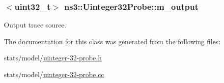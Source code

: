 \subsubsection[{\texorpdfstring{m\+\_\+output}{m_output}}]{$<$uint32\+\_\+t$>$ ns3\+::\+Uinteger32\+Probe\+::m\+\_\+output\hspace{0.3cm}{\ttfamily [private]}}\hypertarget{classns3_1_1Uinteger32Probe_adf56bc1493ebe89ff79c9b51e50989e0}{}\label{classns3_1_1Uinteger32Probe_adf56bc1493ebe89ff79c9b51e50989e0}


Output trace source. 



The documentation for this class was generated from the following files\+:\begin{DoxyCompactItemize}
\item 
stats/model/\hyperlink{uinteger-32-probe_8h}{uinteger-\/32-\/probe.\+h}\item 
stats/model/\hyperlink{uinteger-32-probe_8cc}{uinteger-\/32-\/probe.\+cc}\end{DoxyCompactItemize}
